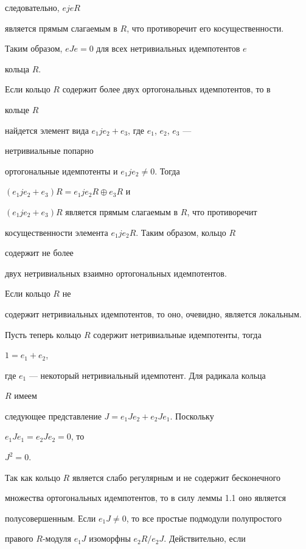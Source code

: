 следовательно, $ejeR$ 


является прямым слагаемым в $R$, что противоречит его косущественности.  


Таким образом, $eJe=0$ для всех нетривиальных идемпотентов $e$ 


кольца $R$. 


 


Если кольцо $R$ содержит более двух ортогональных идемпотентов, то в 


кольце $R$ 


найдется элемент вида $e_1je_2+e_3$, где $e_1$, $e_2$, $e_3$ --- 


нетривиальные попарно  


ортогональные идемпотенты и $e_1je_2\ne0$. Тогда 


$(e_1je_2+e_3)R=e_1je_2R\oplus e_3R$ и  


$(e_1je_2+e_3)R$ является прямым слагаемым в $R$, что противоречит  


косущественности элемента $e_1je_2R$. Таким образом, кольцо $R$ 


содержит не более  


двух нетривиальных взаимно ортогональных идемпотентов. 


 


Если кольцо $R$ не  


содержит нетривиальных идемпотентов, то оно, очевидно, является локальным.  


Пусть теперь кольцо $R$ содержит нетривиальные идемпотенты, тогда 


$1=e_1+e_2$,  


где $e_1$ --- некоторый нетривиальный идемпотент. Для радикала кольца 


$R$ имеем  


следующее представление $J=e_1Je_2+e_2Je_1$. Поскольку 


$e_1Je_1=e_2Je_2=0$, то  


$J^2=0$. 


 


Так как кольцо $R$ является слабо регулярным и не содержит бесконечного  


множества ортогональных идемпотентов, то в силу леммы 1.1 оно является  


полусовершенным. Если $e_1J\ne0$, то все простые подмодули полупростого  


правого $R$-модуля $e_1J$ изоморфны $e_2R/e_2J$. Действительно, если 


